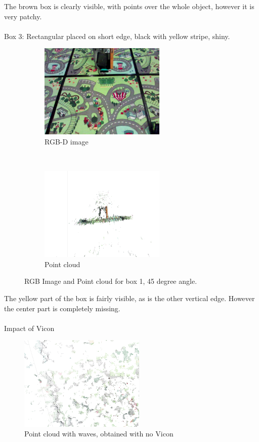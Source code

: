 \documentclass[12pt,a4paper]{article}
\begin{document}
\noindent
The brown box is clearly visible, with points over the whole object, however it is very patchy.
\\\\
\newpage
\noindent
Box 3: Rectangular placed on short edge, black with yellow stripe, shiny. \\
\begin{figure}[h]
  \begin{subfigure}[t]{0.5\textwidth}
  \centering
    \includegraphics[width=60mm]{box_test/cpp-headless-output-118_4_16_2_0_59_1526436059005.png}
  \caption{RGB-D image}
  \end{subfigure}%
  ~
  \begin{subfigure}[t]{0.5\textwidth}
  \centering
    \includegraphics[width=60mm, trim =50mm 50mm 50mm 50mm, clip]{box_test/no_vicon1_281.png}
  \caption{Point cloud}
  \end{subfigure}
  \caption{RGB Image and Point cloud for box 1, 45 degree angle.}
\end{figure}

\noindent
The yellow part of the box is fairly visible, as is the other vertical edge. However the center part is completely missing.
\\\\
Impact of Vicon \\
\begin{figure}[h]
  \centering
    \includegraphics[width=60mm]{box_test/no_vicon1_36_wave.png}
  \caption{Point cloud with waves, obtained with no Vicon}
  \label{f: no vicon waves}
\end{figure}
\end{document}
